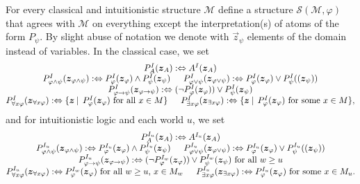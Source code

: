 \documentclass[runningheads]{llncs}
\begin{document}
\begin{definition}\label{def:transf-structure}
	For every classical and intuitionistic structure $\mathcal M$ define a structure $\mathcal S(\mathcal M,\varphi)$ that agrees with $\mathcal M$ on everything except the interpretation(s) of atoms of the form $P_\psi$. By slight abuse of notation we denote with $\vec z_\psi$ elements of the domain instead of variables. In the classical case, we set
	$$\begin{matrix}
		P_A^I(\vec z_A):\Leftrightarrow A^I(\vec z_A)\\
		P_{\varphi\wedge\psi}^I(\vec z_{\varphi\wedge\psi}) :\Leftrightarrow P_{\varphi}^I(\vec z_\varphi)\wedge P_{\psi}^I(\vec z_\psi)\indent P_{\varphi\vee\psi}^I(\vec z_{\varphi\vee\psi}) :\Leftrightarrow P_{\varphi}^I(\vec z_\varphi)\vee P_{\psi}^I((\vec z_\psi))\\P_{\varphi\to\psi}^I(\vec z_{\varphi\to\psi}) :\Leftrightarrow (\neg P_{\varphi}^I(\vec z_{\varphi}))\vee P_{\psi}^I(\vec z_{\psi})\\P_{\forall x\varphi}^I(\vec z_{\forall x\varphi}) :\Leftrightarrow \{\vec z\:|\:\:P_{\varphi}^I(\vec z_\varphi) \text{ for all $x\in M$}\}\indent P_{\exists x\varphi}^I(\vec z_{\exists x\varphi}) :\Leftrightarrow \{\vec z\:|\:\:P_{\varphi}^I(\vec z_\varphi) \text{ for some $x\in M$}\},
	\end{matrix}$$
	and for intuitionistic logic and each world $u$, we set
	$$\begin{matrix}
		P_A^{I_u}(\vec z_A):\Leftrightarrow A^{I_u}(\vec z_A)\\
		P_{\varphi\wedge\psi}^{I_u}(\vec z_{\varphi\wedge\psi}) :\Leftrightarrow P_{\varphi}^{I_u}(\vec z_\varphi)\wedge P_{\psi}^{I_u}(\vec z_\psi)\indent P_{\varphi\vee\psi}^{I_u}(\vec z_{\varphi\vee\psi}) :\Leftrightarrow P_{\varphi}^{I_u}(\vec z_\varphi)\vee P_{\psi}^{I_u}((\vec z_\psi))\\
		P_{\varphi\to\psi}^{I_u}(\vec z_{\varphi\to\psi}) :\Leftrightarrow(\neg P_{\varphi}^{I_w}(\vec z_{\varphi}))\vee P_{\psi}^{I_w}(\vec z_{\psi})\text{ for all $w\geq u$}\\
		P_{\forall x\varphi}^{I_u}(\vec z_{\forall x\varphi}) :\Leftrightarrow P_{\varphi}^{I_w}(\vec z_\varphi) \text{ for all $w\geq u$, $x\in M_w$}\indent P_{\exists x\varphi}^{I_u}(\vec z_{\exists x\varphi}) :\Leftrightarrow P_{\varphi}^{I_u}(\vec z_\varphi) \text{ for some $x\in M_u$}.
	\end{matrix}$$
\end{definition}
\end{document}
